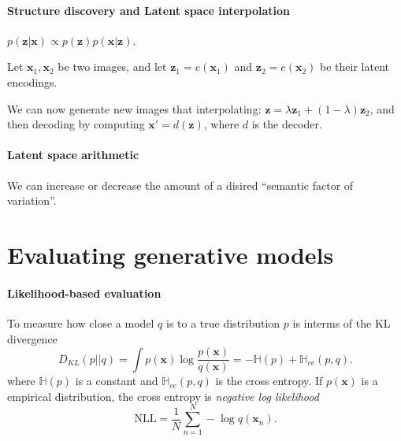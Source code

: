 \documentclass[../main.tex]{subfiles}
\begin{document}
\paragraph{Structure discovery and Latent space interpolation}

$p(\boldsymbol{z} | \boldsymbol{x}) \propto p(\boldsymbol{z})p(\boldsymbol{x} | \boldsymbol{z})$. 


Let $\boldsymbol{x}_{1}, \boldsymbol{x}_{2}$ be two images, and let $\boldsymbol{z}_{1} = e(\boldsymbol{x}_{1})$ and $\boldsymbol{z}_{2} = e(\boldsymbol{x}_{2})$ be their latent encodings.

We can now generate new images that interpolating: $\boldsymbol{z} = \lambda \boldsymbol{z}_{1} + (1-\lambda)\boldsymbol{z}_{2}$, and then decoding by computing $\boldsymbol{x}' = d(\boldsymbol{z})$, where $d$ is the decoder.


\paragraph{Latent space arithmetic}

We can increase or decrease the amount of a disired ``semantic factor of variation''. 


\section{Evaluating generative models}

\paragraph{Likelihood-based evaluation}

To measure how close a model $q$ is to a true distribution $p$ is interms of the KL divergence
\[
D_{KL}(p || q) = \int p(\boldsymbol{x}) \log \frac{p(\boldsymbol{x})}{q(\boldsymbol{x})} = - \mathbb{H}(p)  + \mathbb{H}_{ce}(p, q).
\]
where $\mathbb{H}(p)$ is a constant and $\mathbb{H}_{ce}(p, q)$ is the cross entropy.
If $p(\boldsymbol{x})$ is a empirical distribution, the cross entropy is \emph{negative log likelihood}
\[
\text{NLL} =  \frac{1}{N} \sum_{n=1}^{N} - \log q(\boldsymbol{x}_{n}).
\]
\end{document}
